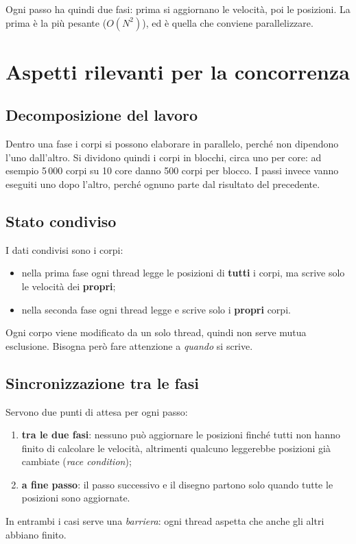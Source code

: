 Ogni passo ha quindi due fasi: prima si aggiornano le velocità, poi le posizioni.
La prima è la più pesante ($O(N^2)$), ed è quella che conviene parallelizzare.

%
%
\section{Aspetti rilevanti per la concorrenza}
\label{sec:aspetti_concorrenza}

\subsection{Decomposizione del lavoro}
Dentro una fase i corpi si possono elaborare in parallelo, perché non dipendono l'uno dall'altro.
Si dividono quindi i corpi in blocchi, circa uno per core: ad esempio 5\,000 corpi su 10 core danno 500 corpi per blocco.
I passi invece vanno eseguiti uno dopo l'altro, perché ognuno parte dal risultato del precedente.

\subsection{Stato condiviso}
I dati condivisi sono i corpi:
\begin{itemize}
  \item nella prima fase ogni thread legge le posizioni di \textbf{tutti} i corpi, ma scrive solo le velocità dei \textbf{propri};
  \item nella seconda fase ogni thread legge e scrive solo i \textbf{propri} corpi.
\end{itemize}
Ogni corpo viene modificato da un solo thread, quindi non serve mutua esclusione.
Bisogna però fare attenzione a \emph{quando} si scrive.

\subsection{Sincronizzazione tra le fasi}
Servono due punti di attesa per ogni passo:
\begin{enumerate}
  \item \textbf{tra le due fasi}: nessuno può aggiornare le posizioni finché tutti non hanno finito di calcolare le velocità, altrimenti qualcuno leggerebbe posizioni già cambiate (\emph{race condition});
  \item \textbf{a fine passo}: il passo successivo e il disegno partono solo quando tutte le posizioni sono aggiornate.
\end{enumerate}
In entrambi i casi serve una \emph{barriera}: ogni thread aspetta che anche gli altri abbiano finito.

